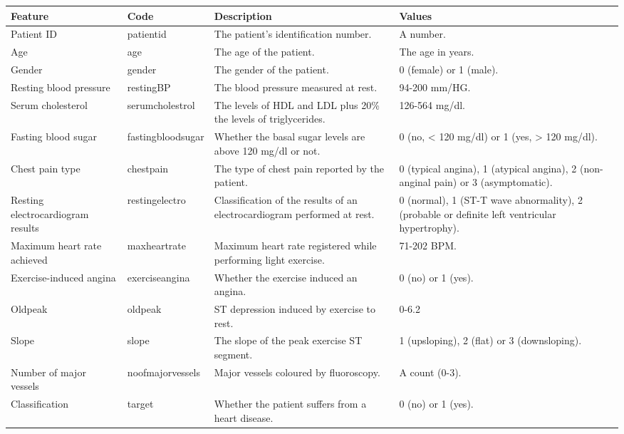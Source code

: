 \small
\begin{tabularx}{\linewidth}{ | X | X | X | X |}
    \caption{Description of features}\label{description-of-features} \\
    \hline
    \textbf{Feature} & \textbf{Code} & \textbf{Description} & \textbf{Values} \\
    \hline
    Patient ID
    & patientid
    & The patient's identification number.
    & A number.\\
    \hline
    Age
    & age
    & The age of the patient.
    & The age in years.\\
    \hline
    Gender
    & gender
    & The gender of the patient.
    & 0 (female) or 1 (male).\\
    \hline
    Resting blood pressure
    & restingBP
    & The blood pressure measured at rest.
    & 94-200 mm/HG.\\
    \hline
    Serum cholesterol
    & serumcholestrol
    & The levels of HDL and LDL plus 20\% the levels of triglycerides.
    & 126-564 mg/dl.\\
    \hline
    Fasting blood sugar
    & fastingbloodsugar
    & Whether the basal sugar levels are above 120 mg/dl or not.
    & 0 (no, < 120 mg/dl) or 1 (yes, > 120 mg/dl).\\
    \hline
    Chest pain type
    & chestpain
    & The type of chest pain reported by the patient.
    & 0 (typical angina), 1 (atypical angina), 2 (non-anginal pain) or 3 (asymptomatic).\\
    \hline
    Resting electrocardiogram results
    & restingelectro
    & Classification of the results of an electrocardiogram performed at rest.
    & 0 (normal), 1 (ST-T wave abnormality), 2 (probable or definite left ventricular hypertrophy).\\
    \hline
    Maximum heart rate achieved
    & maxheartrate
    & Maximum heart rate registered while performing light exercise.
    & 71-202 BPM.\\
    \hline
    Exercise-induced angina
    & exerciseangina
    & Whether the exercise induced an angina.
    & 0 (no) or 1 (yes).\\
    \hline
    Oldpeak
    & oldpeak
    & ST depression induced by exercise to rest.
    & 0-6.2\\
    \hline
    Slope
    & slope
    & The slope of the peak exercise ST segment.
    & 1 (upsloping), 2 (flat) or 3 (downsloping).\\
    \hline
    Number of major vessels
    & noofmajorvessels
    & Major vessels coloured by fluoroscopy.
    & A count (0-3).\\
    \hline
    Classification
    & target
    & Whether the patient suffers from a heart disease.
    & 0 (no) or 1 (yes).\\
    \hline
\end{tabularx}
\normalsize

